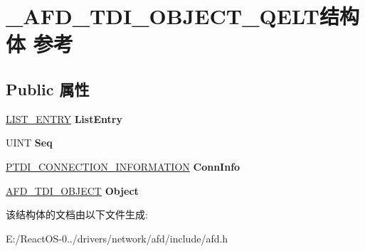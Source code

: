 \hypertarget{struct___a_f_d___t_d_i___o_b_j_e_c_t___q_e_l_t}{}\section{\+\_\+\+A\+F\+D\+\_\+\+T\+D\+I\+\_\+\+O\+B\+J\+E\+C\+T\+\_\+\+Q\+E\+L\+T结构体 参考}
\label{struct___a_f_d___t_d_i___o_b_j_e_c_t___q_e_l_t}
\subsection*{Public 属性}
\begin{DoxyCompactItemize}
\item 
\mbox{\label{struct___a_f_d___t_d_i___o_b_j_e_c_t___q_e_l_t_af1fb214c9c5120acd5b5e8e0f40b1093}} 
\hyperlink{struct___l_i_s_t___e_n_t_r_y}{L\+I\+S\+T\+\_\+\+E\+N\+T\+RY} {\bfseries List\+Entry}
\item 
\mbox{\label{struct___a_f_d___t_d_i___o_b_j_e_c_t___q_e_l_t_a5490ceb196b6b5bcf2b90fe833700a32}} 
U\+I\+NT {\bfseries Seq}
\item 
\mbox{\label{struct___a_f_d___t_d_i___o_b_j_e_c_t___q_e_l_t_aa626e932b6fbeaff8eb290b86b71844e}} 
\hyperlink{struct___t_d_i___c_o_n_n_e_c_t_i_o_n___i_n_f_o_r_m_a_t_i_o_n}{P\+T\+D\+I\+\_\+\+C\+O\+N\+N\+E\+C\+T\+I\+O\+N\+\_\+\+I\+N\+F\+O\+R\+M\+A\+T\+I\+ON} {\bfseries Conn\+Info}
\item 
\mbox{\label{struct___a_f_d___t_d_i___o_b_j_e_c_t___q_e_l_t_aa45e534ff35248f5a632807490f6b06e}} 
\hyperlink{struct___a_f_d___t_d_i___o_b_j_e_c_t}{A\+F\+D\+\_\+\+T\+D\+I\+\_\+\+O\+B\+J\+E\+CT} {\bfseries Object}
\end{DoxyCompactItemize}


该结构体的文档由以下文件生成\+:\begin{DoxyCompactItemize}
\item 
E\+:/\+React\+O\+S-\/0../drivers/network/afd/include/afd.\+h\end{DoxyCompactItemize}
